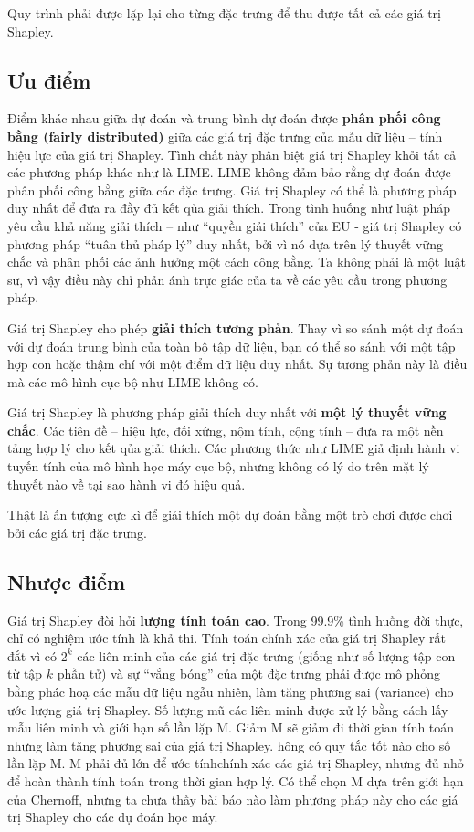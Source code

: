 Quy trình phải được lặp lại cho từng đặc trưng để thu được tất cả các giá trị Shapley.


\subsection{Ưu điểm}
Điểm khác nhau giữa dự đoán và trung bình dự đoán được \textbf{phân phối công bằng (fairly distributed)} giữa các giá trị đặc trưng của mẫu dữ liệu – tính hiệu lực của giá trị Shapley. Tình chất này phân biệt giá trị Shapley khỏi tất cả các phương pháp khác như là LIME. LIME không đảm bảo rằng dự đoán được phân phối công bằng giữa các đặc trưng. Giá trị Shapley có thể là phương pháp duy nhất để đưa ra đầy đủ kết qủa giải thích. Trong tình huống như luật pháp yêu cầu khả năng giải thích – như ``quyền giải thích'' của EU - giá trị Shapley có phương pháp “tuân thủ pháp lý” duy nhất, bởi vì nó dựa trên lý thuyết vững chắc và phân phối các ảnh hưởng một cách công bằng. Ta không phải là một luật sư, vì vậy điều này chỉ phản ánh trực giác của ta về các yêu cầu trong phương pháp.

Giá trị Shapley cho phép \textbf{giải thích tương phản}. Thay vì so sánh một dự đoán với dự đoán trung bình của toàn bộ tập dữ liệu, bạn có thể so sánh với một tập hợp con hoặc thậm chí với một điểm dữ liệu duy nhất. Sự tương phản này là điều mà các mô hình cục bộ như LIME không có.

Giá trị Shapley là phương pháp giải thích duy nhất với \textbf{một lý thuyết vững chắc}. Các tiên đề -- hiệu lực, đối xứng, nộm tính, cộng tính – đưa ra một nền tảng hợp lý cho kết qủa giải thích. Các phương thức như LIME giả định hành vi tuyến tính của mô hình học máy cục bộ, nhưng không có lý do trên mặt lý thuyết nào về tại sao hành vi đó hiệu quả.

Thật là ấn tượng cực kì để giải thích một dự đoán bằng một trò chơi được chơi bởi các giá trị đặc trưng.

\subsection{Nhược điểm}

Giá trị Shapley đòi hỏi \textbf{lượng tính toán cao}. Trong 99.9\% tình huống đời thực, chỉ có nghiệm ước tính là khả thi. Tính toán chính xác của giá trị Shapley rất đắt vì có $2^k$ các liên minh của các giá trị đặc trưng (giống như số lượng tập con từ tập $k$ phần tử) và sự “vắng bóng” của một đặc trưng phải được mô phỏng bằng phác hoạ các mẫu dữ liệu ngẫu nhiên, làm tăng phương sai (variance) cho ước lượng giá trị Shapley. Số lượng mũ các liên minh được xử lý bằng cách lấy mẫu liên minh và giới hạn số lần lặp M. Giảm M sẽ giảm đi thời gian tính toán nhưng làm tăng phương sai của giá trị Shapley. hông có quy tắc tốt nào cho số lần lặp M. M phải đủ lớn để ước tínhchính xác các giá trị Shapley, nhưng đủ nhỏ để hoàn thành tính toán trong thời gian hợp lý. Có thể chọn M dựa trên giới hạn của Chernoff, nhưng ta chưa thấy bài báo nào làm phương pháp này cho các giá trị Shapley cho các dự đoán học máy.

